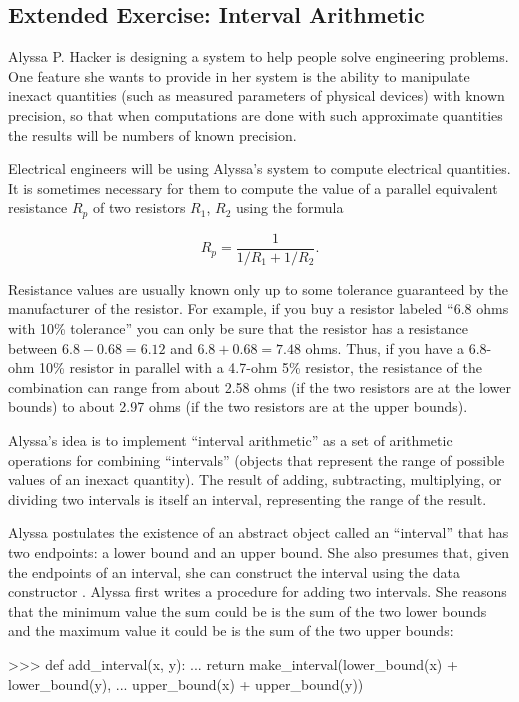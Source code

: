 \subsection{Extended Exercise: Interval Arithmetic}
\label{Section 2.1.4}

Alyssa P. Hacker is designing a system to help people solve engineering
problems.  One feature she wants to provide in her system is the ability to
manipulate inexact quantities (such as measured parameters of physical devices)
with known precision, so that when computations are done with such approximate
quantities the results will be numbers of known precision.

Electrical engineers will be using Alyssa's system to compute electrical
quantities.  It is sometimes necessary for them to compute the value of a
parallel equivalent resistance \( R_p \) of two resistors \( R_1 \), \( R_2 \)
using the formula

$$ R_p = \frac{1}{1 / R_1 + 1 / R_2}.  $$

Resistance values are usually known only up to some tolerance guaranteed by the
manufacturer of the resistor.  For example, if you buy a resistor labeled ``6.8
ohms with 10\% tolerance'' you can only be sure that the resistor has a
resistance between \( 6.8 - 0.68 = 6.12 \) and \( 6.8 + 0.68 = 7.48 \) ohms.  Thus, if you
have a 6.8-ohm 10\% resistor in parallel with a 4.7-ohm 5\% resistor, the
resistance of the combination can range from about 2.58 ohms (if the two
resistors are at the lower bounds) to about 2.97 ohms (if the two resistors are
at the upper bounds).

Alyssa's idea is to implement ``interval arithmetic'' as a set of arithmetic
operations for combining ``intervals'' (objects that represent the range of
possible values of an inexact quantity).  The result of adding, subtracting,
multiplying, or dividing two intervals is itself an interval, representing the
range of the result.

Alyssa postulates the existence of an abstract object called an ``interval''
that has two endpoints: a lower bound and an upper bound.  She also presumes
that, given the endpoints of an interval, she can construct the interval using
the data constructor .  Alyssa first writes a procedure for
adding two intervals.  She reasons that the minimum value the sum could be is
the sum of the two lower bounds and the maximum value it could be is the sum of
the two upper bounds:

\begin{codeBlock}
>>> def add_interval(x, y):
...     return make_interval(lower_bound(x) + lower_bound(y),
...                          upper_bound(x) + upper_bound(y))
\end{codeBlock}

